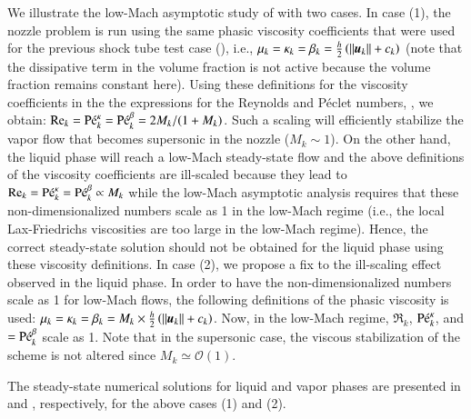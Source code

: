 \documentclass[preprint,10pt]{elsarticle}
\begin{document}
%
We illustrate the low-Mach asymptotic study of  with two cases. 
%
In case (1), the nozzle problem is run using the same phasic viscosity 
coefficients that were used for the previous shock tube test case (), i.e., 
$\mu_k =  \kappa_k = \beta_k = \tfrac{h}{2} \left( ||\boldsymbol u_k|| + c_k \right)$ 
(note that the dissipative term in the volume fraction is not active because the volume fraction remains constant here). 
Using these definitions for the viscosity coefficients in the the expressions for the Reynolds and P\'eclet numbers, , 
we obtain: $\textrm{Re}_k=\textrm{P\'e}_k^\kappa=\textrm{P\'e}_k^\beta = 2M_k / (1+M_k)$. 
Such a scaling will efficiently stabilize the vapor flow that becomes supersonic in the nozzle ($M_k \sim 1 $). On the other hand, the liquid phase will reach 
a low-Mach steady-state flow and the above definitions of the viscosity coefficients are ill-scaled because they lead to $\textrm{Re}_k=\textrm{P\'e}_k^\kappa=\textrm{P\'e}_k^\beta \propto M_k$ 
while the low-Mach asymptotic analysis requires that these non-dimensionalized numbers scale as 1 in the low-Mach regime (i.e., 
the local Lax-Friedrichs viscosities are too large in the low-Mach regime). Hence, the correct steady-state solution
should not be obtained for the liquid phase using these viscosity definitions. 
%
In case (2), we propose a fix to the ill-scaling effect observed in the liquid phase. In order to have the non-dimensionalized numbers scale as 1
for low-Mach flows, the following definitions of the phasic viscosity is used:  $\mu_k =  \kappa_k = \beta_k = M_k \times \tfrac{h}{2} \left( ||\boldsymbol u_k|| + c_k \right)$. 
Now, in the low-Mach regime, $\Re_k$, $\textrm{P\'e}_k^\kappa$, and $=\textrm{P\'e}_k^\beta$ scale as 1. Note that in the supersonic case, the 
viscous stabilization of the scheme is not altered since $M_k \simeq \mathcal{O}(1)$. 

The steady-state numerical solutions for liquid and vapor phases are presented in  and , respectively, 
for the above cases (1) and (2).
\end{document}
